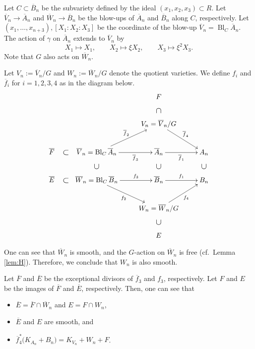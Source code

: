 \documentclass[a4paper,11pt]{amsart}
\theoremstyle{definition}
\theoremstyle{remark}
\begin{document}
Let $C \subset \overline{B}_n$ be the subvariety defined by the ideal $(x_1, x_2, x_3) \subset R$. 
Let $\overline{V}_n \to \overline{A}_n$ and $\overline{W}_n \to \overline{B}_n$ be the blow-ups of $\overline{A}_n$ and $\overline{B}_n$ along $C$, respectively. 
Let $(x_1, \ldots , x_{n+3}), [X_1:X_2:X_3]$ be the coordinate of the blow-up $\overline{V}_n = \operatorname{Bl}_C \overline{A}_n$. 
The action of $\gamma$ on $\overline{A}_n$ extends to $\overline{V}_n$ by 
\[
X_1 \mapsto X_1, \qquad X_2 \mapsto \xi X_2, \qquad X_3 \mapsto \xi ^2 X_3.
\]
Note that $G$ also acts on $\overline{W}_n$. 

Let $V_n :=  \overline{V}_n / G$ and $W_n :=  \overline{W}_n / G$ denote the quotient varieties. 
We define $f_i$ and $\overline{f}_i$ for $i = 1,2,3,4$ as in the diagram below. 
\vspace{3mm}
\[
\xymatrix{
&&F \ar@{}[d]|{\text{\large $\cap$}} &\\
&& V_n = \overline{V}_n /G \ar[dr]^-{\overline{f}_4} & \\
\overline{F} \ar@{}[r]|{\text{\large $\subset$ \hspace{7mm}}} & \overline{V}_n = \operatorname{Bl}_C \overline{A}_n \ar[r]_-{\overline{f}_3} \ar@{}[d]|{\text{\large $\cup$}}  \ar[ur]^-{\overline{f}_2} & \overline{A}_n \ar[r]_-{\overline{f}_1} \ar@{}[d]|{\text{\large $\cup$}} & A_n \ar@{}[d]|{\text{\large $\cup$}} \\
\overline{E} \ar@{}[r]|{\text{\large $\subset$ \hspace{7mm}}}  & \overline{W}_n = \operatorname{Bl}_C \overline{B}_n \ar[r]^-{f_3} \ar[dr]_-{f_2} & \overline{B}_n \ar[r]^-{f_1} & B_n \\
&& W_n = \overline{W}_n /G \ar[ur]_-{f_4} &\\
&&E \ar@{}[u]|{\text{\large $\cup$}}&
}
\]
\vspace{3mm}


One can see that $\overline{W}_n$ is smooth, and the $G$-action on $\overline{W}_n$ is free (cf.\ Lemma \ref{lem:H}). 
Therefore, we conclude that $W_n$ is also smooth. 

Let $\overline{F}$ and $\overline{E}$ be the exceptional divisors of $\overline{f}_3$ and $f_3$, respectively. 
Let $F$ and $E$ be the images of $\overline{F}$ and $\overline{E}$, respectively. 
Then, one can see that 
\begin{itemize}
\item $\overline{E} = \overline{F} \cap \overline{W}_n$ and $E = F \cap W_n$,
\item $\overline{E}$ and $E$ are smooth, and
\item $\overline{f}^*_4 \bigl( K_{A_n} + B_n \bigr) = K_{V_n} + W_n + F$. 
\end{itemize}
\end{document}
